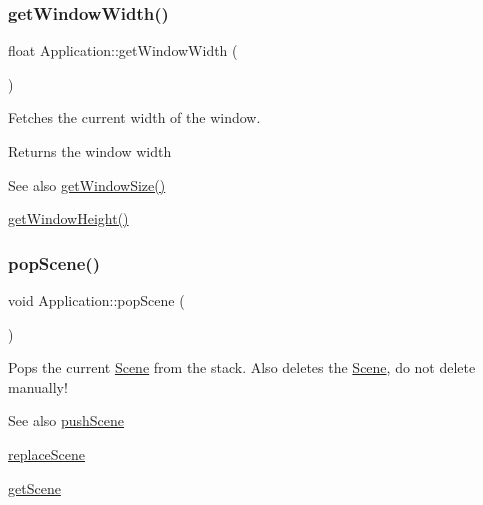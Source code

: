 \subsubsection{\texorpdfstring{getWindowWidth()}{getWindowWidth()}}
{\footnotesize\ttfamily float Application\+::get\+Window\+Width (\begin{DoxyParamCaption}{ }\end{DoxyParamCaption})}



Fetches the current width of the window. 

\begin{DoxyReturn}{Returns}
the window width 
\end{DoxyReturn}
\begin{DoxySeeAlso}{See also}
\mbox{\hyperlink{classsage_1_1Application_ac0fa1750ee8dcacc37cc9eaed72f12f9}{get\+Window\+Size()}} 

\mbox{\hyperlink{classsage_1_1Application_a20be3d592c9d2662051796420d0cd1d8}{get\+Window\+Height()}} 
\end{DoxySeeAlso}
\mbox{\label{classsage_1_1Application_a47b5bec61b3d93cbb4998b42d0d2ea47}} 
\subsubsection{\texorpdfstring{popScene()}{popScene()}}
{\footnotesize\ttfamily void Application\+::pop\+Scene (\begin{DoxyParamCaption}{ }\end{DoxyParamCaption})}



Pops the current \mbox{\hyperlink{classsage_1_1Scene}{Scene}} from the stack. Also deletes the \mbox{\hyperlink{classsage_1_1Scene}{Scene}}, do not delete manually! 

\begin{DoxySeeAlso}{See also}
\mbox{\hyperlink{classsage_1_1Application_aa4644a106875cb18286b08131cb807d2}{push\+Scene}} 

\mbox{\hyperlink{classsage_1_1Application_ac0458ccb5b0a4aae4bcb1fc958f369f4}{replace\+Scene}} 

\mbox{\hyperlink{classsage_1_1Application_a4d40d8fae7f9f26cf45d8fca6e811c3f}{get\+Scene}} 
\end{DoxySeeAlso}
\mbox{\label{classsage_1_1Application_aa4644a106875cb18286b08131cb807d2}} 
